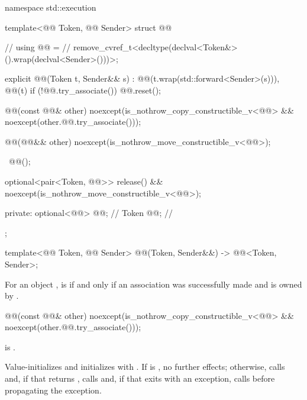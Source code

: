 %
\begin{codeblock}
namespace std::execution {
  template<@@ Token, @@ Sender>
  struct @@ {                                       // \expos
    using @@ =                                         // \expos
      remove_cvref_t<decltype(declval<Token&>().wrap(declval<Sender>()))>;

    explicit @@(Token t, Sender&& s)
      : @@(t.wrap(std::forward<Sender>(s))),
        @@(t) {
      if (!@@.try_associate())
        @@.reset();
    }

    @@(const @@& other)
      noexcept(is_nothrow_copy_constructible_v<@@> &&
               noexcept(other.@@.try_associate()));

    @@(@@&& other)
      noexcept(is_nothrow_move_constructible_v<@@>);

    ~@@();

    optional<pair<Token, @@>>
      release() && noexcept(is_nothrow_move_constructible_v<@@>);

  private:
    optional<@@> @@;  // \expos
    Token @@;                 // \expos
  };

  template<@@ Token, @@ Sender>
    @@(Token, Sender&&) -> @@<Token, Sender>;
}
\end{codeblock}

\pnum
For an  object ,
 is 
if and only if
an association was successfully made and is owned by .

%
\begin{itemdecl}
@@(const @@& other)
  noexcept(is_nothrow_copy_constructible_v<@@> &&
           noexcept(other.@@.try_associate()));
\end{itemdecl}

\begin{itemdescr}
\pnum
\constraints
{} is .

\pnum
\effects
Value-initializes  and
initializes  with .
If  is ,
no further effects;
otherwise,
calls  and,
if that returns ,
calls  and,
if that exits with an exception,
calls  before propagating the exception.
\end{itemdescr}

